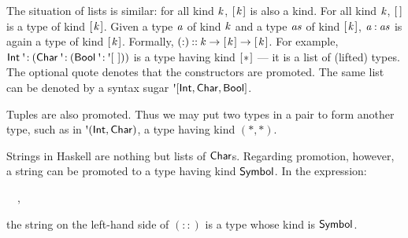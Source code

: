The situation of lists is similar: for all kind \ensuremath{\Varid{k}}, \ensuremath{[\mskip1.5mu \Varid{k}\mskip1.5mu]} is also a kind. For
all kind \ensuremath{\Varid{k}}, \ensuremath{[\mskip1.5mu \mskip1.5mu]} is a type of kind \ensuremath{[\mskip1.5mu \Varid{k}\mskip1.5mu]}. Given a type \ensuremath{\Varid{a}} of kind \ensuremath{\Varid{k}} and a
type \ensuremath{\Varid{as}} of kind \ensuremath{[\mskip1.5mu \Varid{k}\mskip1.5mu]}, \ensuremath{\Varid{a}\mathbin{:}\Varid{as}} is again a type of kind \ensuremath{[\mskip1.5mu \Varid{k}\mskip1.5mu]}. Formally,
\ensuremath{(\mathbin{:})\mathbin{::}\Varid{k}\to [\mskip1.5mu \Varid{k}\mskip1.5mu]\to [\mskip1.5mu \Varid{k}\mskip1.5mu]}. For example, \ensuremath{\Conid{Int}\mathbin{\mbox{\textquotesingle}\!:}(\Conid{Char}\mathbin{\mbox{\textquotesingle}\!:}(\Conid{Bool}\mathbin{\mbox{\textquotesingle}\!:}\mbox{\textquotesingle}[~]))} is a
type having kind \ensuremath{[\mskip1.5mu \mathbin{*}\mskip1.5mu]} --- it is a list of (lifted) types. The optional quote
denotes that the constructors are promoted. The same list can be denoted by a
syntax sugar \ensuremath{\mbox{\textquotesingle}[\Conid{Int},\Conid{Char},\Conid{Bool}]}.

Tuples are also promoted. Thus we may put two types in a pair to form another
type, such as in \ensuremath{\mbox{\textquotesingle}(\Conid{Int},\Conid{Char})}, a type having kind \ensuremath{(\mathbin{*},\mathbin{*})}.

Strings in Haskell are nothing but lists of \ensuremath{\Conid{Char}}s. Regarding promotion,
however, a string can be promoted to a type having kind \ensuremath{\Conid{Symbol}}. In the expression:
\begin{hscode}\SaveRestoreHook
{}%
%
\>[B]{}\mathbin{::}~~,{}\<[E]%
\ColumnHook
\end{hscode}\resethooks
the string on the left-hand side of \ensuremath{(\mathbin{::})} is a type whose kind is \ensuremath{\Conid{Symbol}}.

